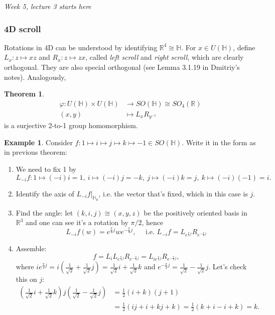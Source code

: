 \documentclass[a4paper]{article}
\newcommand{\R}{\mathbb{R}}
\newcommand{\Hq}{\mathbb{H}}
\theoremstyle{definition}
\newtheorem{thm}[defn]{Theorem}
\newtheorem{example}[defn]{Example}
\begin{document}
\begin{flushright}
\textit{Week 5, lecture 3 starts here}
\end{flushright}

\subsubsection{4D scroll}
Rotations in 4D can be understood by identifying $\R^4\cong\Hq$. For $x\in U(\Hq)$, define $L_x:z\mapsto xz$ and $R_x:z\mapsto zx$, called \textit{left scroll} and \textit{right scroll}, which are clearly orthogonal. They are also special orthogonal (see Lemma 3.1.19 in Dmitriy's notes). Analogously,
\begin{thm}
\[
\begin{aligned}
\varphi:U(\Hq)\times U(\Hq)&\rightarrow SO(\Hq)\cong SO_4(\R)\\
(x,y)&\mapsto L_xR_{y^{-1}}
\end{aligned}
\]
is a surjective 2-to-1 group homomorphism.
\end{thm}

\begin{example}
Consider $f:1\mapsto i\mapsto j\mapsto k\mapsto -1\in SO(\Hq)$. Write it in the form as in previous theorem:
\begin{enumerate}
\item We need to fix 1 by \[
L_{-i}f:1\mapsto (-i)i=1,\ i\mapsto (-i)j=-k,\ j\mapsto (-i)k=j,\ k\mapsto (-i)(-1)=i.
\]
\item Identify the axis of $L_{-i}f|_{\Hq_0}$, i.e. the vector that's fixed, which in this case is $j$.
\item Find the angle: let $(k,i,j)\cong(x,y,z)$ be the positively oriented basis in $\R^3$ and one can see it's a rotation by $\pi/2$, hence
\[
L_{-i}f(w)=e^{\frac{\pi}{4}j}we^{-\frac{\pi}{4}j},\quad \text{ i.e. }L_{-i}f=L_{e^{\frac{\pi}{4}j}}R_{e^{-\frac{\pi}{4}j}}
\]
\item Assemble:
\[
f=L_i L_{e^{\frac{\pi}{4}j}} R_{e^{-\frac{\pi}{4}j}}=L_{ie^{\frac{\pi}{4}j}} R_{e^{-\frac{\pi}{4}j}},
\]
where $ie^{\frac{\pi}{4}j}=i\left(\frac{1}{\sqrt 2}+\frac{1}{\sqrt 2}j\right)=\frac{1}{\sqrt 2}i+\frac{1}{\sqrt 2}k$ and $e^{-\frac{\pi}{4}j}=\frac{1}{\sqrt 2}-\frac{1}{\sqrt 2}j$. Let's check this on $j$:
\[
\begin{aligned}
\left(\frac{1}{\sqrt 2}i+\frac{1}{\sqrt 2}k\right)j\left(\frac{1}{\sqrt 2}-\frac{1}{\sqrt 2}j\right)&=\frac12 (i+k)(j+1)\\
&=\frac12 (ij+i+kj+k)=\frac12(k+i-i+k)=k.
\end{aligned}
\]
\end{enumerate}
\end{example}
\end{document}
